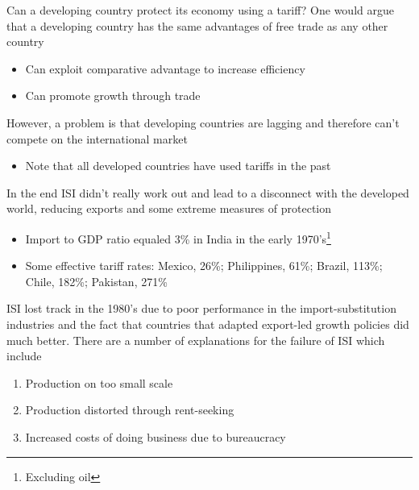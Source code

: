 \documentclass{beamer}
\begin{document}
\begin{frame}
 Can a developing country protect its economy using a tariff?
 One would argue that a developing country has the same advantages of free trade as any other country
 \begin{itemize}
   \item Can exploit comparative advantage to increase efficiency
   \item Can promote growth through trade
 \end{itemize}
 \medskip
 However, a problem is that developing countries are lagging and therefore can't compete on the international market
 \begin{itemize}
   \item Note that all developed countries have used tariffs in the past
 \end{itemize}
\end{frame}


\begin{frame}
 In the end ISI didn't really work out and lead to a disconnect with the developed world, reducing exports and some extreme measures of protection
 \begin{itemize}
   \item Import to GDP ratio equaled 3\% in India in the early 1970's\footnote{Excluding oil}
   \item Some effective tariff rates: Mexico, 26\%; Philippines, 61\%; Brazil, 113\%; Chile, 182\%; Pakistan, 271\%
 \end{itemize}
\end{frame}

\begin{frame}
 ISI lost track in the 1980's due to poor performance in the import-substitution industries and the fact that countries that adapted export-led growth policies did much better.
 There are a number of explanations for the failure of ISI which include
 \begin{enumerate}
   \item Production on too small scale
   \item Production distorted through rent-seeking
   \item Increased costs of doing business due to bureaucracy
 \end{enumerate}
\end{frame}
\end{document}
